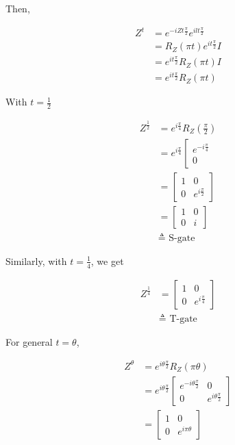 \documentclass[main.tex]{subfiles}
\begin{document}
    Then,
    
    $$
    \begin{aligned}
    Z^{t} &=e^{-i Z t \frac{\pi}{2}} e^{i l t \frac{\pi}{2}} \\
    &=R_{Z}(\pi t) e^{i t \frac{\pi}{2}} I \\
    &=e^{i t \frac{\pi}{2}} R_{Z}(\pi t) I \\
    &=e^{i t \frac{\pi}{2}} R_{Z}(\pi t)
    \end{aligned}
    $$
    
    With $t=\frac{1}{2}$
    
    $$
    \begin{aligned}
    Z^{\frac{1}{2}} &=e^{i \frac{\pi}{4}} R_{Z}\left(\frac{\pi}{2}\right) \\
    &=e^{i \frac{\pi}{4}}\left[\begin{array}{c}
    e^{-i \frac{\pi}{4}} \\
    0
    \end{array}\right.\\
    &=\left[\begin{array}{cc}
    1 & 0 \\
    0 & e^{i \frac{\pi}{2}}
    \end{array}\right] \\
    &=\left[\begin{array}{ll}
    1 & 0 \\
    0 & i
    \end{array}\right] \\
    & \triangleq \text { S-gate }
    \end{aligned}
    $$
    
    Similarly, with $t=\frac{1}{4}$, we get
    
    $$
    \begin{aligned}
    Z^{\frac{1}{4}} &=\left[\begin{array}{cc}
    1 & 0 \\
    0 & e^{i \frac{\pi}{4}}
    \end{array}\right] \\
    & \triangleq \text { T-gate }
    \end{aligned}
    $$
    
    For general $t=\theta$,
    
    $$
    \begin{aligned}
    Z^{\theta} &=e^{i \theta \frac{\pi}{2}} R_{Z}(\pi \theta) \\
    &=e^{i \theta \frac{\pi}{2}}\left[\begin{array}{cc}
    e^{-i \theta \frac{\pi}{2}} & 0 \\
    0 & e^{i \theta \frac{\pi}{2}}
    \end{array}\right] \\
    &=\left[\begin{array}{cc}
    1 & 0 \\
    0 & e^{i \pi \theta}
    \end{array}\right]
    \end{aligned}
    $$
    
\end{document}
